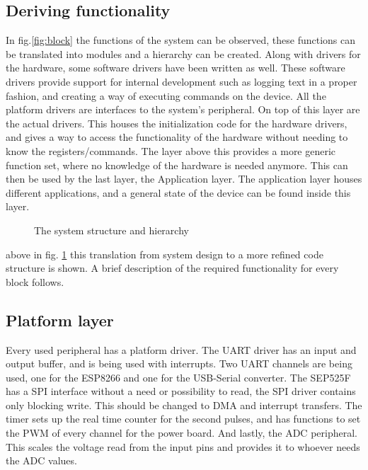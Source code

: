 \subsection{Deriving functionality}
In fig.\ref{fig:block} the functions of the system can be observed, these functions can be translated into modules and a hierarchy can be created. Along with drivers for the hardware, some software drivers have been written as well. These software drivers provide support for internal development such as logging text in a proper fashion, and creating a way of executing commands on the device. All the platform drivers are interfaces to the system's peripheral. On top of this layer are the actual drivers. This houses the initialization code for the hardware drivers, and gives a way to access the functionality of the hardware without needing to know the registers/commands. The layer above this provides a more generic function set, where no knowledge of the hardware is needed anymore. This can then be used by the last layer, the Application layer. The application layer houses different applications, and a general state of the device can be found inside this layer.
\begin{figure}[H]
	\centering
	\label{fig:block_code}
	\caption{The system structure and hierarchy}
\end{figure}
above in fig. \ref{fig:block_code} this translation from system design to a more refined code structure is shown. A brief description of the required functionality for every block follows. 

\subsection{Platform layer}

Every used peripheral has a platform driver. The UART driver has an input and output buffer, and is being used with interrupts. Two UART channels are being used, one for the ESP8266 and one for the USB-Serial converter. The SEP525F has a SPI interface without a need or possibility to read, the SPI driver contains only blocking write. This should be changed to DMA and interrupt transfers. The timer sets up the real time counter for the second pulses, and has functions to set the PWM of every channel for the power board. And lastly, the ADC peripheral. This scales the voltage read from the input pins and provides it to whoever needs the ADC values.
